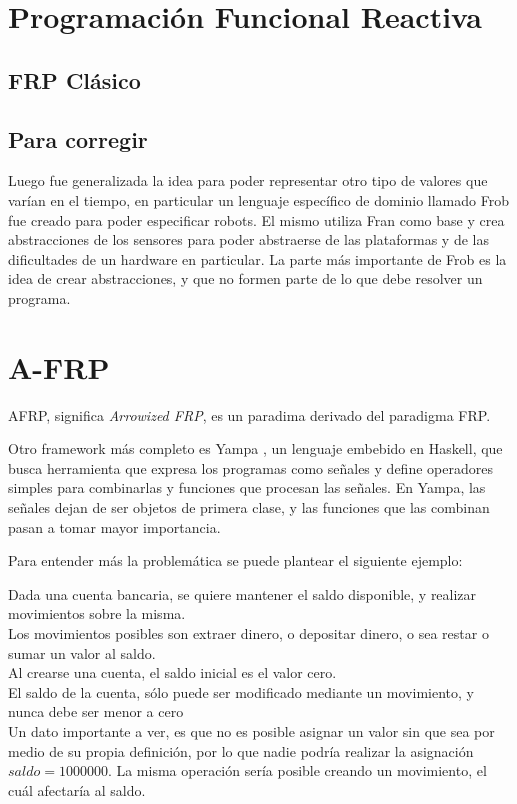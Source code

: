 
\section{Programación Funcional Reactiva}



\subsection{FRP Clásico}



\subsection{Para corregir}

  Luego fue generalizada la idea para poder representar otro tipo de valores que
varían en el tiempo, en particular un lenguaje específico de dominio llamado
Frob \cite{petersonhudakelliot99:lambdainmotion} fue creado para poder especificar
robots. El mismo utiliza Fran como base y crea abstracciones de los sensores
para poder abstraerse de las plataformas y de las dificultades de un hardware en particular.
  La parte más importante de Frob es la idea de crear abstracciones, y que no formen
parte de lo que debe resolver un programa.


\section{A-FRP}

  AFRP, significa \textit{Arrowized FRP}, es un paradima derivado del paradigma FRP.

  Otro framework más completo es Yampa \cite{yampa}, un lenguaje embebido en Haskell,
que busca 
  herramienta que expresa los programas como señales y
define operadores simples para combinarlas y funciones que procesan las señales.
  En Yampa, las señales dejan de ser objetos de primera clase, y las funciones que
las combinan pasan a tomar mayor importancia.


  
Para entender más la problemática se puede plantear el siguiente ejemplo:

\begin{center}
  Dada una cuenta bancaria, se quiere mantener el saldo disponible,
y realizar movimientos sobre la misma.\\

  Los movimientos posibles son extraer dinero, o depositar dinero,
o sea restar o sumar un valor al saldo.\\

  Al crearse una cuenta, el saldo inicial es el valor cero.\\

  El saldo de la cuenta, sólo puede ser modificado mediante un movimiento,
  y nunca debe ser menor a cero\\

  Un dato importante a ver, es que no es posible asignar un valor
sin que sea por medio de su propia definición, por lo que nadie
podría realizar la asignación $saldo = 1000000$.
  La misma operación sería posible creando un movimiento, el cuál
afectaría al saldo.
\end{center}

